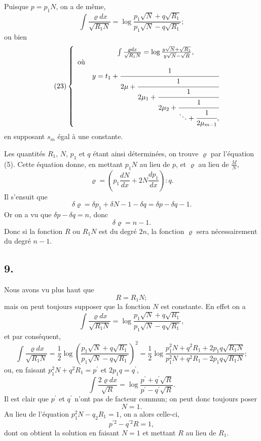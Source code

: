 \documentclass[oneside, 12 pt, leqno]{memoir}
\begin{document}
Puisque \(p=p_1 N\), on a de même,
\[\int \frac{\varrho d x}{\sqrt{R_1 N}}=\log \frac{p_1 \sqrt{ N }+q \sqrt{R_1}}{p_1 \sqrt{ N }-q \sqrt{R_1}};\]
ou bien
\[\tag{23} \left\{ \begin{array}{lc} & \int \frac{\varrho dx}{\sqrt{R_1N}} = \log \frac{y \sqrt{N} + \sqrt{R_1}}{y\sqrt{N} - \sqrt{R}},\\ \text{où} \\ &y = t_1 + \cfrac{1}{2\mu+\cfrac{1}{2\mu_1 + \cfrac{1}{2\mu_2+\cfrac{1}{\ddots + \cfrac{1}{2\mu_{m-1}},}}}} \end{array} \right.\]
en supposant \(s_m\) égal à une constante.

Les quantités \(R_1\), \(N\), \(p_1\) et \(q\) étant ainsi déterminées, on trouve \(\varrho\)
par l'équation (5). Cette équation donne, en mettant \(p_1 N\) au lieu de \(p\), et \(\varrho\) au lieu de \(\frac{M}{N}\),
\[\varrho=\left(p_1 \frac{d N}{d x}+2 N \frac{d p_1}{d x}\right): q.\]
Il s'ensuit que
\[\delta \varrho=\delta p_1+\delta N-1-\delta q=\delta p-\delta q-1.\]
Or on a vu que \(\delta p-\delta q=n\), donc
\[\delta \varrho=n-1.\]
Donc si la fonction \(R\) ou \(R_1 N\) est du degré \(2 n\), la fonction \(\varrho\) sera nécessairement du degré \(n-1\).

\subsection*{9.}

Nous avons vu plus haut que
\[R=R_1 N;\]
mais on peut toujours supposer que la fonction \(N\) est constante. En effet on a
\[\int \frac{\varrho d x}{\sqrt{R_1 N}}=\log \frac{p_1 \sqrt{N}+q \sqrt{R_1}}{p_1 \sqrt{N}-q \sqrt{R_1}},\]
et par conséquent,
\[\int \frac{\varrho d x}{\sqrt{R_1 N}}=\frac{1}{2} \log \left(\frac{p_1 \sqrt{N}+q \sqrt{R_1}}{p_1 \sqrt{N}-q \sqrt{R_1}}\right)^2=\frac{1}{2} \log \frac{p_1^2 N+q^2 R_1+2 p_1 q \sqrt{R_1 N}}{p_1^2 N+q^2 R_1-2 p_1 q \sqrt{R_1 N}};\]
ou, en faisant \(p_1^2 N+q^2 R_1=p^{\prime}\) et \(2 p_1 q=q^{\prime}\),
\[\int \frac{2 \varrho d x}{\sqrt{R}}=\log \frac{p^{\prime}+q^{\prime} \sqrt{R}}{p^{\prime}-q^{\prime} \sqrt{R}}.\]
Il est clair que \(p^{\prime}\) et \(q^{\prime}\) n'ont pas de facteur commun; on peut donc toujours poser
\[N=1.\]
Au lieu de l'équation \(p_1^2 N-q_2 R_1=1\), on a alors celle-ci,
\[p^{\prime 2}-q^{\prime 2} R=1,\]
dont on obtient la solution en faisant \(N=1\) et mettant \(R\) au lieu de \(R_1\). 
\end{document}
